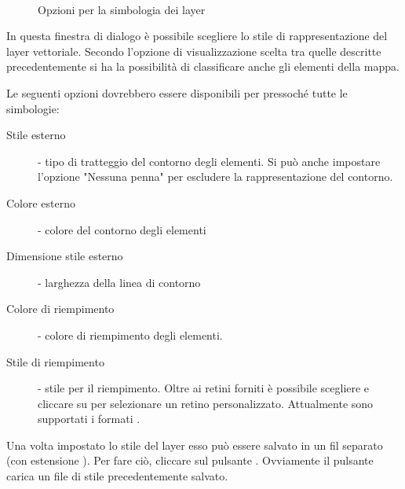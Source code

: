 \begin{figure}[h]
\centering
\caption{Opzioni per la simbologia dei layer \nixcaption}
   \goodgap
   \\
   \goodgap
\end{figure}


 \label{sec:style_options} 
In questa finestra di dialogo è possibile scegliere lo stile di
rappresentazione del layer vettoriale. Secondo l'opzione di visualizzazione
scelta tra quelle descritte precedentemente si ha la possibilità di
classificare anche gli elementi della mappa.

Le seguenti opzioni dovrebbero essere disponibili per pressoché tutte le
simbologie:
\begin{description}
 \item[Stile esterno] - tipo di tratteggio del contorno degli elementi. Si può
 anche impostare l'opzione "Nessuna penna" per escludere la rappresentazione
 del contorno.
 \item[Colore esterno] - colore del contorno degli elementi
 \item[Dimensione stile esterno] - larghezza della linea di contorno
 \item[Colore di riempimento] - colore di riempimento degli elementi.
 \item[Stile di riempimento] - stile per il riempimento. Oltre ai retini forniti è possibile scegliere  e cliccare su \browsebutton per selezionare un retino personalizzato. Attualmente sono supportati i formati .
\end{description}

Una volta impostato lo stile del layer esso può essere salvato in un fil
separato (con estensione ).
Per fare ciò, cliccare sul pulsante . Ovviamente il
pulsante  carica un file di stile precedentemente
salvato.

